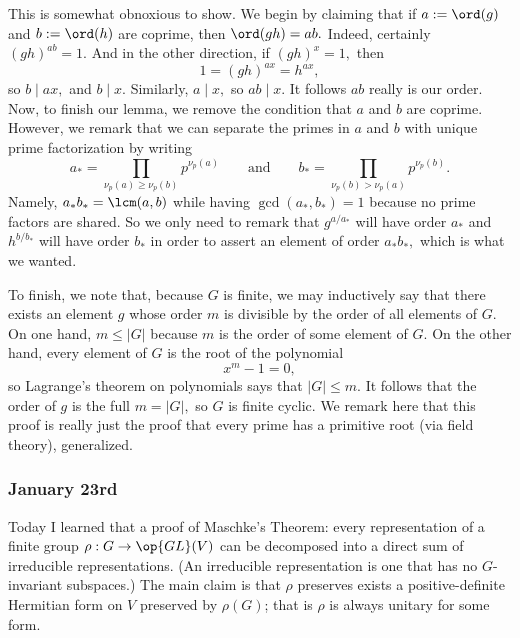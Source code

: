 This is somewhat obnoxious to show. We begin by claiming that if $a:=\ord(g)$ and $b:=\ord(h)$ are coprime, then $\ord(gh)=ab.$ Indeed, certainly $(gh)^{ab}=1.$ And in the other direction, if $(gh)^x=1,$ then
\[1=(gh)^{ax}=h^{ax},\]
so $b\mid ax,$ and $b\mid x.$ Similarly, $a\mid x,$ so $ab\mid x.$ It follows $ab$ really is our order. Now, to finish our lemma, we remove the condition that $a$ and $b$ are coprime. However, we remark that we can separate the primes in $a$ and $b$ with unique prime factorization by writing
\[a_*=\prod_{\nu_p(a)\ge\nu_p(b)}p^{\nu_p(a)}\qquad\text{and}\qquad b_*=\prod_{\nu_p(b)>\nu_p(a)}p^{\nu_p(b)}.\]
Namely, $a_*b_*=\lcm(a,b)$ while having $\gcd(a_*,b_*)=1$ because no prime factors are shared. So we only need to remark that $g^{a/a_*}$ will have order $a_*$ and $h^{b/b_*}$ will have order $b_*$ in order to assert an element of order $a_*b_*,$ which is what we wanted.

To finish, we note that, because $G$ is finite, we may inductively say that there exists an element $g$ whose order $m$ is divisible by the order of all elements of $G.$ On one hand, $m\le|G|$ because $m$ is the order of some element of $G.$ On the other hand, every element of $G$ is the root of the polynomial
\[x^m-1=0,\]
so Lagrange's theorem on polynomials says that $|G|\le m.$ It follows that the order of $g$ is the full $m=|G|,$ so $G$ is finite cyclic. We remark here that this proof is really just the proof that every prime has a primitive root (via field theory), generalized.

\subsubsection{January 23rd}
Today I learned that a proof of Maschke’s Theorem: every representation of a finite group $\rho:G\to\op{GL}(V)$ can be decomposed into a direct sum of irreducible representations. (An irreducible representation is one that has no $G$-invariant subspaces.) The main claim is that $\rho$ preserves exists a positive-definite Hermitian form on $V$ preserved by $\rho(G)$; that is $\rho$ is always unitary for some form.

